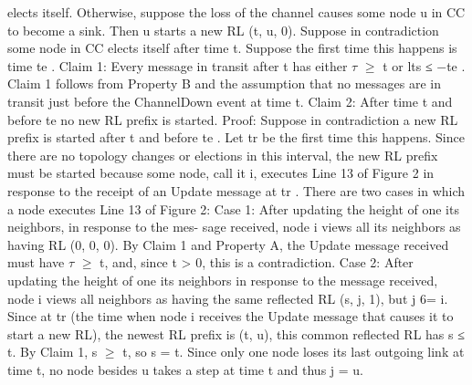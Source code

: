 elects itself. Otherwise, suppose the loss of the channel causes some node u in CC to become a sink. Then u starts a new RL (t, u, 0). Suppose in contradiction some node in CC elects itself after time t. Suppose the first time this happens is time te . Claim 1: Every message in transit after t has either $\tau$ $\geq$ t or lts ≤ −te . Claim 1 follows from Property B and the assumption that no messages are in transit just before the ChannelDown event at time t. Claim 2: After time t and before te no new RL prefix is started. Proof: Suppose in contradiction a new RL prefix is started after t and before te . Let tr be the first time this happens. Since there are no topology changes or elections in this interval, the new RL prefix must be started because some node, call it i, executes Line 13 of Figure 2 in response to the receipt of an Update message at tr . There are two cases in which a node executes Line 13 of Figure 2: Case 1: After updating the height of one its neighbors, in response to the mes- sage received, node i views all its neighbors as having RL (0, 0, 0). By Claim 1 and Property A, the Update message received must have $\tau$ $\geq$ t, and, since t > 0, this is a contradiction. Case 2: After updating the height of one its neighbors in response to the message received, node i views all neighbors as having the same reflected RL (s, j, 1), but j 6= i. Since at tr (the time when node i receives the Update message that causes it to start a new RL), the newest RL prefix is (t, u), this common reflected RL has s ≤ t. By Claim 1, s $\geq$ t, so s = t. Since only one node loses its last outgoing link at time t, no node besides u takes a step at time t and thus j = u.
